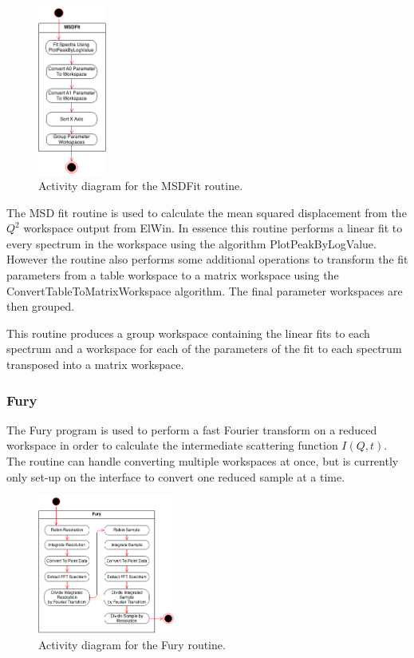 \documentclass[paper=a4, fontsize=11pt]{scrartcl}	%
\numberwithin{equation}{section}															%
\numberwithin{figure}{section}																%
\numberwithin{table}{section}																%
\begin{document}
\begin{figure}[H]
\centering
\includegraphics[width=0.2\textwidth]{img/uml/activity_diagrams/MSDFit_activity.png}
\caption{Activity diagram for the MSDFit routine.}
\label{fig:msdfit-acticity-diagram}
\end{figure}

The MSD fit routine is used to calculate the mean squared displacement from the $Q^2$ workspace output from ElWin. In essence this routine performs a linear fit to every spectrum in the workspace using the algorithm PlotPeakByLogValue. However the routine also performs some additional operations to transform the fit parameters from a table workspace to a matrix workspace using the ConvertTableToMatrixWorkspace algorithm. The final parameter workspaces are then grouped.

This routine produces a group workspace containing the linear fits to each spectrum and a workspace for each of the parameters of the fit to each spectrum transposed into a matrix workspace.

\subsubsection{Fury}
\label{subsubsec:fury}
The Fury program is used to perform a fast Fourier transform on a reduced workspace in order to calculate the intermediate scattering function $I(Q,t)$. The routine can handle converting multiple workspaces at once, but is currently only set-up on the interface to convert one reduced sample at a time.

\begin{figure}[H]
\centering
\includegraphics[width=0.4\textwidth]{img/uml/activity_diagrams/Fury_activity.png}
\caption{Activity diagram for the Fury routine.}
\label{fig:fury-activity-diagram}
\end{figure}
\end{document}
